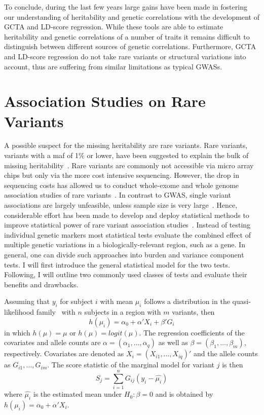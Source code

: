 To conclude, during the last few years large gains have been made in fostering our understanding of heritability and genetic correlations with the development of GCTA and LD-score regression.
While these tools are able to estimate heritability and genetic correlations of a number of traits it remains difficult to distinguish between different sources of genetic correlations.
Furthermore, GCTA and LD-score regression do not take rare variants or structural variations into account, thus are suffering from similar limitations as typical GWASs.

\section{Association Studies on Rare Variants}
\label{sec:association_studies_on_rare_varitants}

A possible suspect for the missing heritability are rare variants.
Rare variants,  variants with a \acrfull{maf} of 1\% or lower, have been suggested to explain the bulk of missing heritability~\cite{Jiang2013,Li2009a}.
Rare variants are commonly not accessible via micro array chips but only via the more cost intensive sequencing.
However, the drop in sequencing costs has allowed us to conduct whole-exome and whole genome association studies of rare variants~\cite{Goodwin2016}.
In contrast to GWAS, single variant associations are largely unfeasible, unless sample size is very large~\cite{Lee2014}.
Hence, considerable effort has been made to develop and deploy statistical methods to improve statistical power of rare variant association studies~\cite{Morris2010,Zeng2014,Daye2012,Manuscript2013}.
Instead of testing individual genetic markers most statistical tests evaluate the combined effect of multiple genetic variations in a biologically-relevant region, such as a gene.
In general, one can divide such approaches into burden and variance component tests.
I will first introduce the general statistical model for the two tests.
Following, I will outline two commonly used classes of tests and evaluate their benefits and drawbacks.

Assuming that $y_i$ for subject $i$ with mean $\mu_i$ follows a distribution in the quasi-likelihood family~\cite{Lee2014} with $n$ subjects in a region with $m$ variants, then
\begin{equation}
  h(\mu_i) = \alpha_0 + \alpha'X_i +\beta'G_i
\end{equation}
in which $h(\mu) = \mu$ or $h(\mu) = logit(\mu)$.
The regression coefficients of the covariates and allele counts are $\alpha = (\alpha_1, \ldots, \alpha_q)$ as well as $\beta = (\beta_1, \ldots, \beta_m)$, respectively.
Covariates are denoted as $X_i = (X_{i1}, \ldots, X_{iq})'$ and the allele counts as $G_{i1}, \ldots, G_{im}$.
The score statistic of the marginal model for variant $j$ is then
\begin{equation}
  S_j = \sum^n_{i=1} G_{ij}(y_i-\hat{\mu_i})
\end{equation}
where $\hat{\mu_i}$ is the estimated mean under $H_0: \beta = 0 $ and is obtained by $h(\mu_i) = \alpha_0 + \alpha'X_i$.

